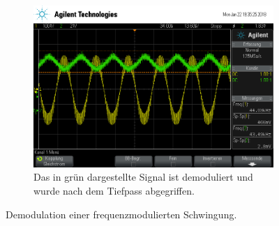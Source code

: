 \begin{figure}[t!]
\begin{subfigure}[t]{0.5\textwidth}
		\includegraphics[width=\textwidth]{img/h_scope_237.png}
		\caption{Das in grün dargestellte Signal ist demoduliert und wurde nach dem Tiefpass abgegriffen.}
		\label{De-FM-RC}
	\end{subfigure}
	\caption{Demodulation einer frequenzmodulierten Schwingung.}
\end{figure}

\FloatBarrier
